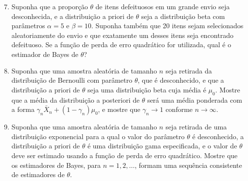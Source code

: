 \documentclass[leqno, 12pt]{article}
\theoremstyle{definition}
\begin{document}
\begin{enumerate}
\setcounter{enumi}{6}


\item \textbf{\parencite[ex. 2, pág. 416]{DeGroot:2014}} Suponha que a proporção $\theta$ de itens defeituosos em um grande envio seja desconhecida, e a distribuição a priori de $\theta$ seja a distribuição beta com parâmetros $\alpha = 5$ e $\beta = 10$. Suponha também que 20 itens sejam selecionados aleatoriamente do envio e que exatamente um desses itens seja encontrado defeituoso. Se a função de perda de erro quadrático for utilizada, qual é o estimador de Bayes de $\theta$?


\item \textbf{\parencite[ex. 4, pág. 416]{DeGroot:2014}} Suponha que uma amostra aleatória de tamanho \(n\) seja retirada da distribuição de Bernoulli com parâmetro \( \theta \), que é desconhecido, e que a distribuição a priori de \( \theta \) seja uma distribuição beta cuja média é \( \mu_0 \). Mostre que a média da distribuição a posteriori de \( \theta \) será uma média ponderada com a forma \( \gamma_n \bar X_n + (1 - \gamma_n) \mu_0 \), e mostre que \( \gamma_n \rightarrow 1 \) conforme \( n \rightarrow \infty \).


\item \textbf{\parencite[ex. 11, pág. 416]{DeGroot:2014}} Suponha que uma amostra aleatória de tamanho \( n \) seja retirada de uma distribuição exponencial para a qual o valor do parâmetro \( \theta \) é desconhecido, a distribuição a priori de \( \theta \) é uma distribuição gama especificada, e o valor de \( \theta \) deve ser estimado usando a função de perda de erro quadrático. Mostre que os estimadores de Bayes, para \( n = 1, 2, \ldots \), formam uma sequência consistente de estimadores de \( \theta \).

\end{enumerate}
\end{document}
